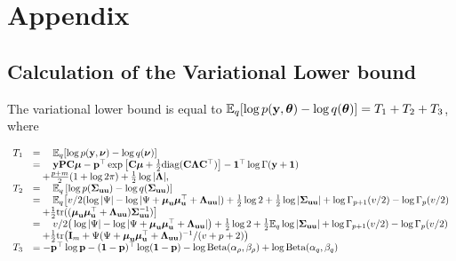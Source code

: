 \documentclass{article}[12pt]
\begin{document}
	\newpage
	\section{Appendix} 
	\subsection{Calculation of the Variational Lower bound}
	
	The variational lower bound is equal to ${\mathbb E}_q[\log{p({\bf y}, {\boldsymbol\theta})} - \log{q({\boldsymbol\theta})}] = T_1 + T_2 + T_3$,
	where
	
	$$
	\begin{array}{rl}
		T_1 & = \quad {\mathbb E}_q[\log{p({\bf y}, {\boldsymbol\nu})} - \log{q({\boldsymbol\nu})}]                                                                                                                                                  \\
		    & = \quad {\bf y} {\bf P} {\bf C} {\boldsymbol\mu} - {\bf p}^\top \exp{\left[ {\bf C}{\boldsymbol\mu}+  \tfrac{1}{2} \text{diag} ({\bf C}{\boldsymbol\Lambda}{\bf C}^\top) \right]} - {\bf 1}^\top\log \Gamma{({\bf y}+ {\bf1})}                                               \\
		    & \quad + \frac{p + m}{2} (1 + \log{2 \pi}) + \tfrac{1}{2} \log{|{\boldsymbol\Lambda}|},                                                                                                                                \\
		T_2 & = \quad {\mathbb E}_q \left[ \log p({\boldsymbol \Sigma}_{{\bf u} {\bf u}}) - \log q({\boldsymbol \Sigma}_{{\bf u} {\bf u}}) \right]                                                                                                                 \\
		    & = \quad {\mathbb E}_q \big[ v/2(\log |\Psi| - \log |\Psi + {\boldsymbol \mu}_{\bf u} {\boldsymbol \mu}_{\bf u}^\top + {\boldsymbol \Lambda}_{{\bf u} {\bf u}}|) + \tfrac{1}{2} \log 2 + \tfrac{1}{2} \log|{\boldsymbol \Sigma}_{{\bf u} {\bf u}}| + \log \Gamma_{p+1}(v/2) - \log \Gamma_{p}(v/2)    \\
		    & \quad + \tfrac{1}{2} \text{tr}(({\boldsymbol \mu}_{{\bf u}} {\boldsymbol \mu}_{{\bf u}}^\top + {\boldsymbol \Lambda}_{{\bf u} {\bf u}}) {\boldsymbol \Sigma}_{{\bf u} {\bf u}}^{-1}) \big]                                                                                                  \\
		    & = \quad v/2\big(\log |\Psi| - \log |\Psi + {\boldsymbol \mu}_{\bf u} {\boldsymbol \mu}_{\bf u}^\top + {\boldsymbol \Lambda}_{{\bf u} {\bf u}}|\big) + \tfrac{1}{2} \log 2 + \tfrac{1}{2} {\mathbb E}_q \log |{\boldsymbol \Sigma}_{{\bf u} {\bf u}}| + \log \Gamma_{p+1}(v/2) - \log \Gamma_{p}(v/2) \\
		    & \quad + \tfrac{1}{2} \text{tr}\big({\bf I}_m + \Psi(\Psi+ {\boldsymbol \mu}_{\bf u} {\boldsymbol \mu}_{\bf u}^\top + {\boldsymbol \Lambda}_{{\bf u} {\bf u}})^{-1}/(v + p + 2)\big)                                                                                        \\
		T_3 & = - {\bf p}^\top \log {\bf p} - ({\bf 1} - {\bf p})^\top \log ({\bf 1} - {\bf p}) - \log \text{Beta} (\alpha_\rho, \beta_\rho) + \log \text{Beta} (\alpha_q, \beta_q)                                                              
	\end{array}
	$$
	
\end{document}
